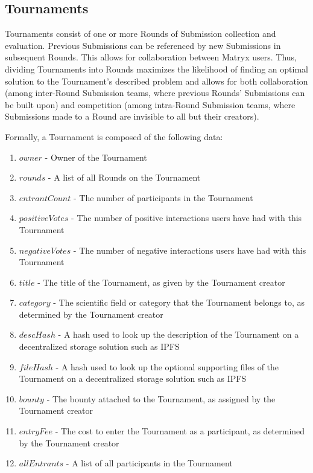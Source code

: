 \documentclass[a4paper, 10pt, conference]{ieeeconf}      %
\begin{document}
\subsection{Tournaments}\label{Tournaments}

Tournaments consist of one or more Rounds of Submission collection and evaluation. Previous Submissions can be referenced by new Submissions in subsequent Rounds. This allows for collaboration between Matryx users.
Thus, dividing Tournaments into Rounds maximizes the likelihood of finding an optimal solution to the Tournament's described problem and allows for both collaboration (among inter-Round Submission teams, where previous Rounds' Submissions can be built upon) and competition (among intra-Round Submission teams, where Submissions made to a Round are invisible to all but their creators).

Formally, a Tournament is composed of the following data:
\begin{enumerate}
\item $owner$ - Owner of the Tournament
\item $rounds$ - A list of all Rounds on the Tournament
\item $entrantCount$ - The number of participants in the Tournament
\item $positiveVotes$ - The number of positive interactions users have had with this Tournament
\item $negativeVotes$ - The number of negative interactions users have had with this Tournament
\item $title$ - The title of the Tournament, as given by the Tournament creator
\item $category$ - The scientific field or category that the Tournament belongs to, as determined by the Tournament creator
\item $descHash$ - A hash used to look up the description of the Tournament on a decentralized storage solution such as IPFS
\item $fileHash$ - A hash used to look up the optional supporting files of the Tournament on a decentralized storage solution such as IPFS
\item $bounty$ - The bounty attached to the Tournament, as assigned by the Tournament creator
\item $entryFee$ - The cost to enter the Tournament as a participant, as determined by the Tournament creator
\item $allEntrants$ - A list of all participants in the Tournament
\end{enumerate}
\end{document}
